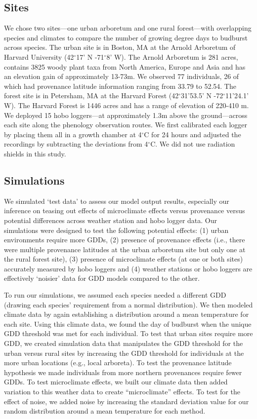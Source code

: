 \documentclass{article}\usepackage[]{graphicx}\usepackage[]{color}
\begin{document}
\subsection*{Sites}
We chose two sites---one urban arboretum and one rural forest---with overlapping species and climates to compare the number of growing degree days to budburst across species. The urban site is in Boston, MA at the Arnold Arboretum of Harvard University (42$^{\circ}$17' N -71$^{\circ}$8' W). The Arnold Arboretum is 281 acres, contains 3825 woody plant taxa from North America, Europe and Asia and has an elevation gain of approximately 13-73m. We observed 77 individuals, 26 of which had provenance latitude information ranging from 33.79 to 52.54. The forest site is in Petersham, MA at the Harvard Forest (42$^{\circ}$31'53.5' N -72$^{\circ}$11'24.1' W). The Harvard Forest is 1446 acres and has a range of elevation of 220-410 m. We deployed 15 hobo loggers---at approximately 1.3m above the ground---across each site along the phenology observation routes. We first calibrated each logger by placing them all in a growth chamber at 4$^{\circ}$C for 24 hours and adjusted the recordings by subtracting the deviations from 4$^{\circ}$C. We did not use radiation shields in this study.

\subsection*{Simulations}
We simulated `test data' to assess our model output results, especially our inference on teasing out effects of microclimate effects versus provenance versus potential differences across weather station and hobo logger data. Our simulations were designed to test the following potential effects: (1) urban environments require more GDDs, (2) presence of provenance effects (i.e., there were multiple provenance latitudes at the urban arboretum site but only one at the rural forest site), (3) presence of microclimate effects (at one or both sites) accurately measured by hobo loggers and (4) weather stations or hobo loggers are effectively `noisier' data for GDD models compared to the other. 

To run our simulations, we assumed each species needed a different GDD (drawing each species' requirement from a normal distribution). We then modeled climate data by again establishing a distribution around a mean temperature for each site. Using this climate data, we found the day of budburst when the unique GDD threshold was met for each individual. To test that urban sites require more GDD, we created simulation data that manipulates the GDD threshold for the urban versus rural sites by increasing the GDD threshold for individuals at the more urban locations (e.g., local arboreta). To test the provenance latitude hypothesis we made individuals from more northern provenances require fewer GDDs. To test microclimate effects, we built our climate data then added variation to this weather data to create ``microclimate'' effects.  To test for the effect of noise, we added noise by increasing the standard deviation value for our random distribution around a mean temperature for each method.
\end{document}
